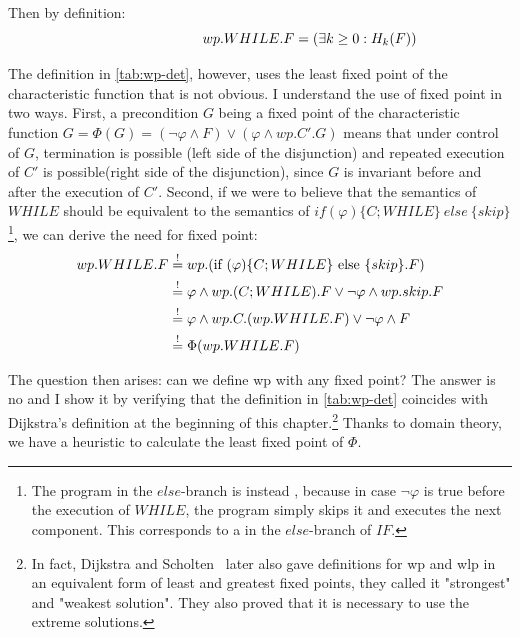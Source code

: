 
Then by definition: 
\begin{equation}
  \hspace{2.5cm}wp.WHILE.F=(\exists k\geq 0: H_k(F)) \label{eq:while}
\end{equation}

The definition in \autoref{tab:wp-det}, however, uses the least fixed point of the characteristic function that is not obvious. 
I understand the use of fixed point in two ways. 
First, a precondition $G$ being a fixed point of the characteristic function $G= \Phi(G)=(\neg\varphi\wedge F)\vee(\varphi\wedge wp.C'.G)$ means that under control of $G$, termination is possible (left side of the disjunction) and repeated execution of $C'$ is possible(right side of the disjunction), since $G$ is invariant before and after the execution of $C'$. 
Second, if we were to believe that the semantics of $WHILE$ should be equivalent to the semantics of $if(\varphi)\{C;WHILE\}\ else\ \{skip\}$
\footnote{The program in the $else$-branch is  instead , because in case $\neg\varphi$ is true before the execution of $WHILE$, the program simply skips it and executes the next component. This corresponds to a  in the $else$-branch of $IF$. }, 
we can derive the need for fixed point: 
\begin{align*} 
  wp.WHILE.F    & \stackrel{!}{=} wp.(\text{if }(\varphi)\{C;WHILE\}\text{ else }\{skip\}.F) \\
                & \stackrel{!}{=} \varphi\wedge wp.(C;WHILE).F \vee \neg\varphi\wedge wp.skip.F\\ 
                & \stackrel{!}{=} \varphi\wedge wp.C.(wp.WHILE.F) \vee \neg\varphi\wedge F\\ 
                & \stackrel{!}{=} \Phi(wp.WHILE.F)\\ 
\end{align*}

The question then arises: can we define wp with any fixed point? 
The answer is no and I show it by verifying that the definition in \autoref{tab:wp-det} coincides with Dijkstra's definition at the beginning of this chapter.\footnote{In fact, Dijkstra and Scholten~\cite{dijkstra90} later also gave definitions for wp and wlp in an equivalent form of least and greatest fixed points, they called it "strongest" and "weakest solution". They also proved that it is necessary to use the extreme solutions. }
Thanks to domain theory, we have a heuristic to calculate the least fixed point of $\Phi$. 

